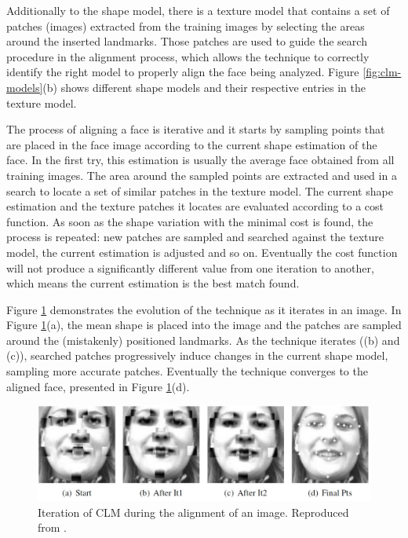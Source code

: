 Additionally to the shape model, there is a texture model that contains a set of patches (images) extracted from the training images by selecting the areas around the inserted landmarks. Those patches are used to guide the search procedure in the alignment process, which allows the technique to correctly identify the right model to properly align the face being analyzed. Figure \ref{fig:clm-models}(b) shows different shape models and their respective entries in the texture model.

The process of aligning a face is iterative and it starts by sampling points that are placed in the face image according to the current shape estimation of the face. In the first try, this estimation is usually the average face obtained from all training images. The area around the sampled points are extracted and used in a search to locate a set of similar patches in the texture model. The current shape estimation and the texture patches it locates are evaluated according to a cost function. As soon as the shape variation with the minimal cost is found, the process is repeated: new patches are sampled and searched against the texture model, the current estimation is adjusted and so on. Eventually the cost function will not produce a significantly different value from one iteration to another, which means the current estimation is the best match found.

Figure \ref{fig:clm-evolution} demonstrates the evolution of the technique as it iterates in an image. In Figure \ref{fig:clm-evolution}(a), the mean shape is placed into the image and the patches are sampled around the (mistakenly) positioned landmarks. As the technique iterates ((b) and (c)), searched patches progressively induce changes in the current shape model, sampling more accurate patches. Eventually the technique converges to the aligned face, presented in Figure \ref{fig:clm-evolution}(d).

\begin{figure}[h]
    \centering
    \includegraphics[width=\linewidth]{Content/figures/clm-evolution.jpg}
    \caption{Iteration of CLM during the alignment of an image. Reproduced from \textcite{cristinacce2006feature}.}
    \label{fig:clm-evolution}
\end{figure}

